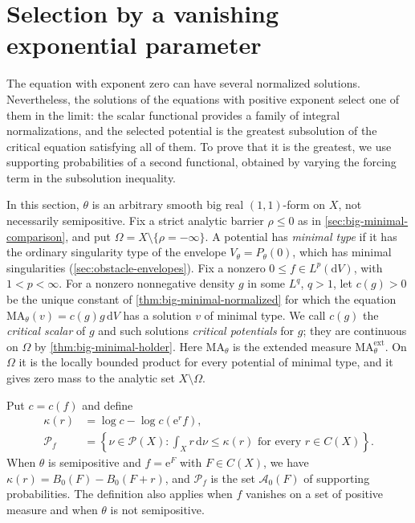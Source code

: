\section{Selection by a vanishing exponential parameter}
\label{sec:vanishing-parameter-selection}

The equation with exponent zero can have several normalized solutions. Nevertheless, the solutions of the equations with positive exponent select one of them in the limit: the scalar functional provides a family of integral normalizations, and the selected potential is the greatest subsolution of the critical equation satisfying all of them. To prove that it is the greatest, we use supporting probabilities of a second functional, obtained by varying the forcing term in the subsolution inequality.

In this section, $\theta$ is an arbitrary smooth big real $(1,1)$-form on $X$, not necessarily semipositive. Fix a strict analytic barrier $\rho\leq0$ as in \cref{sec:big-minimal-comparison}, and put $\Omega=X\setminus\{\rho=-\infty\}$. A potential has \emph{minimal type} if it has the ordinary singularity type of the envelope $V_\theta=P_\theta(0)$, which has minimal singularities (\cref{sec:obstacle-envelopes}). Fix a nonzero $0\leq f\in L^p(\mathrm{d}V)$, with $1<p<\infty$. For a nonzero nonnegative density $g$ in some $L^q$, $q>1$, let $c(g)>0$ be the unique constant of \cref{thm:big-minimal-normalized} for which the equation $\mathrm{MA}_\theta(v)=c(g)g\,\mathrm{d}V$ has a solution $v$ of minimal type. We call $c(g)$ the \emph{critical scalar} of $g$ and such solutions \emph{critical potentials} for $g$; they are continuous on $\Omega$ by \cref{thm:big-minimal-holder}. Here $\mathrm{MA}_\theta$ is the extended measure $\mathrm{MA}^{\mathrm{ext}}_\theta$. On $\Omega$ it is the locally bounded product for every potential of minimal type, and it gives zero mass to the analytic set $X\setminus\Omega$.

Put $c=c(f)$ and define
\begin{equation}\label{eq:selection-probabilities}
 \begin{aligned}
 \kappa(r)&=\log c-\log c(\mathrm{e}^r f),\\
 \mathcal P_f&=\left\{\nu\in\mathcal P(X):
       \int_X r\,\mathrm{d}\nu\leq\kappa(r)
       \text{ for every }r\in C(X)\right\}.
 \end{aligned}
\end{equation}
When $\theta$ is semipositive and $f=\mathrm{e}^F$ with $F\in C(X)$, we have $\kappa(r)=B_0(F)-B_0(F+r)$, and $\mathcal P_f$ is the set $\mathcal A_0(F)$ of supporting probabilities. The definition also applies when $f$ vanishes on a set of positive measure and when $\theta$ is not semipositive.

